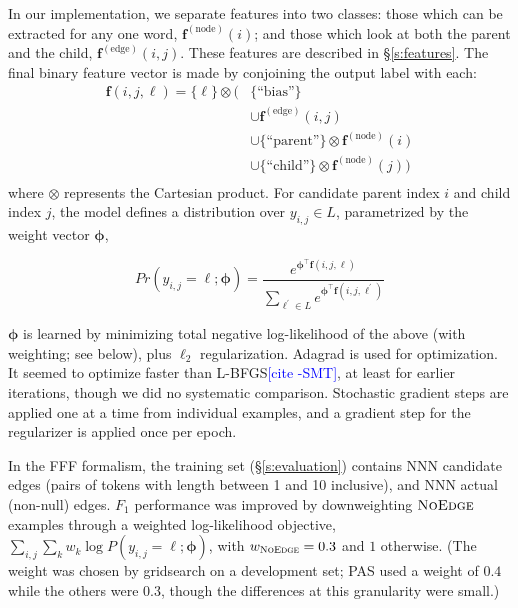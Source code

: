 \documentclass[11pt]{article}
\newcommand{\sam}[1]{\textcolor{blue}{[#1 -SMT]}}
\newcommand{\noedge}{\textsc{NoEdge}}
\begin{document}
In our implementation, we separate features into two classes:
those which can be extracted for any one word, $\bm{f}^{(\text{node})}(i)$;
and those which look at both the parent and the child,
$\bm{f}^{(\text{edge})}(i, j)$.
These features are described in \S\ref{s:features}.
The final binary feature vector is made by conjoining the output label with
each:
\begin{align*} 
\bm{f}(i, j, \ell) =
\{ \ell \} \otimes (& 
	\{ \text{``bias''} \} \\
	& \cup \bm{f}^{(\text{edge})}(i, j) \\
	& \cup \{ \text{``parent''} \} \otimes \bm{f}^{(\text{node})}(i) \\
	& \cup \{ \text{``child''} \} \otimes \bm{f}^{(\text{node})}(j)
)\\
\end{align*}
\noindent
where  $\otimes$ represents the Cartesian product.
For candidate parent index $i$ and child index $j$, the model defines a
distribution over $y_{i,j} \in L$, parametrized by the weight vector $\bm\phi$,

\begin{equation}
  Pr(y_{i,j}=\ell; \bm\phi)  = \frac{
  	e^{\bm\phi^\top \bm{f}(i, j, \ell)}
  } {
  	\sum_{\ell^\prime \in L} {
  		e^{\bm\phi^\top \bm{f}(i, j, \ell^\prime)}
  	}
  }
\end{equation}

\noindent
$\bm\phi$ is learned by minimizing total negative log-likelihood of the above
(with weighting; see below), plus $\ell_2$ regularization.
Adagrad \cite{duchi_adaptive_2011} is used for optimization.
It seemed to optimize faster than L-BFGS\sam{cite}, at least for earlier
iterations, though we did no systematic comparison. Stochastic gradient steps are applied one at a time from individual examples, and a gradient step for the regularizer is applied once per epoch.

In the FFF formalism, the training set (\S\ref{s:evaluation})
contains NNN candidate edges (pairs of tokens with length between 1 and 10 inclusive),
and NNN actual (non-null) edges.  $F_1$ performance was improved by
downweighting $\noedge$ examples through a weighted log-likelihood objective,
$\sum_{i,j} \sum_k w_k \log P(y_{i,j}=\ell; \bm\phi)$, with $w_{\noedge}=0.3$
and $1$ otherwise.
(The weight was chosen by gridsearch on a development set; 
PAS used a weight of $0.4$ while the others were $0.3$, though the differences at this granularity were small.)
\end{document}
